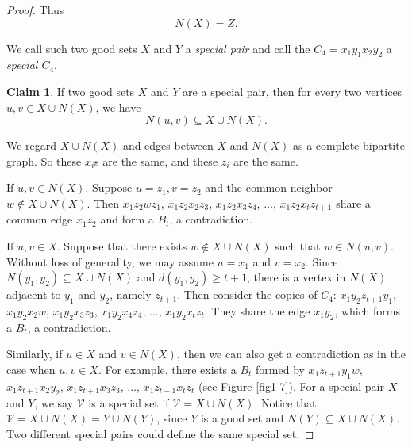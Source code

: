 \documentclass[11pt,a4paper]{article}
\theoremstyle{definition}
\newtheorem{claimthm}{Claim}[section]
\newenvironment{claimproof}
  {\renewcommand{\qedsymbol}{\ensuremath{\blacksquare}}\proof}
  {\endproof}
  {\endproof}
\begin{document}
\begin{proof}
        
        Thus
        \begin{equation*}
            N(X) = Z.
        \end{equation*}

        We call such two good sets $X$ and $Y$ a {\it special pair} and call the $C_4=x_1y_1x_2y_2$ a {\it special $C_4$}.

        \begin{claimthm}\label{cla: 312}
            If two good sets $X$ and $Y$ are a special pair, then for every two vertices $u,v\in X\cup N(X)$, we have $$N(u,v)\subseteq X\cup N(X).$$
        \end{claimthm}
        \begin{claimproof}
            We regard $X\cup N(X)$ and edges between $X$ and $N(X)$ as a complete bipartite graph.
            So these $x_i$s are the same, and these $z_i$ are the same.
            
            If $u,v\in N(X)$. Suppose $u = z_1, v = z_2$ and the common neighbor $w \notin X\cup N(X)$.
            Then $x_1 z_2 w z_1$, $x_1 z_2 x_2 z_3$, $x_1 z_2 x_3 z_4$, $\dots$, $x_1 z_2 x_t z_{t+1}$ share a common edge $x_1 z_2$ and form a $B_t$, a contradiction.
            
            If $u,v\in X$. 
            Suppose that there exists $w\not\in X \cup N(X)$ such that $w\in N(u,v)$.
            Without loss of generality, we may assume $u=x_1$ and $v=x_2$.
            Since $N(y_1,y_2)\subseteq X\cup N(X)$ and $d(y_1,y_2) \geq t+1$, there is a vertex in $N(X)$ adjacent to $y_1$ and $y_2$, namely $z_{t+1}$.
            Then consider the copies of $C_4$: $x_1 y_2 z_{t+1} y_1$, $x_1 y_2 x_2 w$, $x_1 y_2 x_3 z_3$, $x_1 y_2 x_4 z_4$, $\dots$, $x_1 y_2 x_t z_{t}$. They share the edge $x_1y_2$, which forms a $B_t$, a contradiction. 

            Similarly, if $u\in X$ and $v\in N(X)$, then we can also get a contradiction as in the case when $u,v\in X$. For example, there exists a $B_t$ formed by $x_1 z_{t+1} y_1 w$, $x_1 z_{t+1} x_2 y_2$, $x_1 z_{t+1} x_3 z_3$, $\dots$, $x_1 z_{t+1} x_t z_t$ (see Figure \ref{fig1-7}). 
        \end{claimproof}
        For a special pair $X$ and $Y$, we say $\mathcal{V}$ is a special set if $\mathcal{V}=X\cup N(X)$.
        Notice that $\mathcal{V}=X\cup N(X) = Y\cup N(Y)$, since $Y$ is a good set and $N(Y) \subseteq X\cup N(X).$
        Two different special pairs could define the same special set.


\end{proof}
\end{document}
